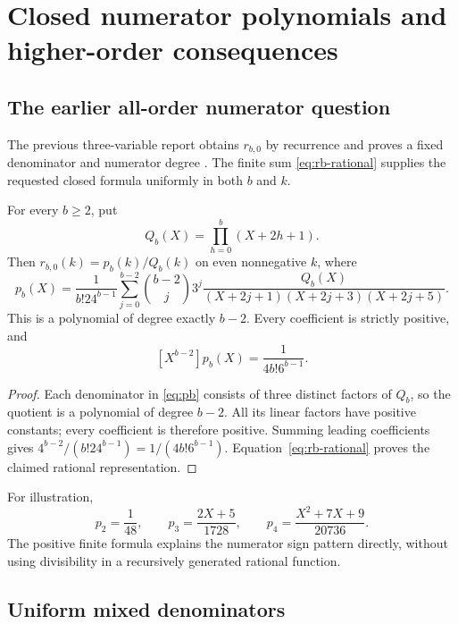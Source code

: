 \section{Closed numerator polynomials and higher-order consequences}
\label{sec:numerators}

\subsection{The earlier all-order numerator question}

The previous three-variable report obtains $r_{b,0}$ by recurrence and proves a fixed denominator and numerator degree \cite{RepoSector}. The finite sum \eqref{eq:rb-rational} supplies the requested closed formula uniformly in both $b$ and $k$.

\begin{corollary}\label{cor:pb}
For every $b\ge2$, put
\[
 Q_b(X)=\prod_{h=0}^b(X+2h+1).
\]
Then $r_{b,0}(k)=p_b(k)/Q_b(k)$ on even nonnegative $k$, where
\begin{equation}\label{eq:pb}
 p_b(X)=\frac1{b!24^{b-1}}
 \sum_{j=0}^{b-2}\binom{b-2}{j}3^j
 \frac{Q_b(X)}{(X+2j+1)(X+2j+3)(X+2j+5)}.
\end{equation}
This is a polynomial of degree exactly $b-2$. Every coefficient is strictly positive, and
\begin{equation}\label{eq:pb-leading}
 [X^{b-2}]p_b(X)=\frac1{4b!6^{b-1}}.
\end{equation}
\end{corollary}
\begin{proof}
Each denominator in \eqref{eq:pb} consists of three distinct factors of $Q_b$, so the quotient is a polynomial of degree $b-2$. All its linear factors have positive constants; every coefficient is therefore positive. Summing leading coefficients gives
$4^{b-2}/(b!24^{b-1})=1/(4b!6^{b-1})$. Equation~\eqref{eq:rb-rational} proves the claimed rational representation.
\end{proof}

For illustration,
\[
 p_2=\frac1{48},\qquad
 p_3=\frac{2X+5}{1728},\qquad
 p_4=\frac{X^2+7X+9}{20736}.
\]
The positive finite formula explains the numerator sign pattern directly, without using divisibility in a recursively generated rational function.

\subsection{Uniform mixed denominators}

